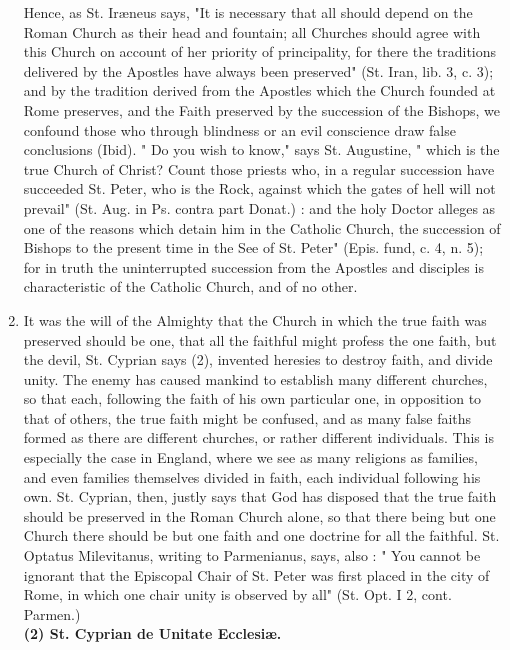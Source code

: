 \documentclass[12pt]{book}
\begin{document}
\begin{enumerate}
Hence, as St. Iræneus says, "It is necessary that all should depend on the Roman Church as their head and
fountain; all Churches should agree with this Church on account of her priority of principality, for there
the traditions delivered by the Apostles have always been preserved" (St. Iran, lib. 3, c. 3); and by the
tradition derived from the Apostles which the Church founded at Rome preserves, and the Faith
preserved by the succession of the Bishops, we confound those who through blindness or an evil
conscience draw false conclusions (Ibid). " Do you wish to know," says St. Augustine, " which is the true
Church of Christ? Count those priests who, in a regular succession have succeeded St. Peter, who is the
Rock, against which the gates of hell will not prevail" (St. Aug. in Ps. contra part Donat.) : and the holy
Doctor alleges as one of the reasons which detain him in the Catholic Church, the succession of Bishops to
the present time in the See of St. Peter" (Epis. fund, c. 4, n. 5); for in truth the uninterrupted succession
from the Apostles and disciples is characteristic of the Catholic Church, and of no other.

\item It was the will of the Almighty that the Church in which the true faith was preserved should be one,
that all the faithful might profess the one faith, but the devil, St. Cyprian says (2), invented heresies to
destroy faith, and divide unity. The enemy has caused mankind to establish many different churches, so
that each, following the faith of his own particular one, in opposition to that of others, the true faith might
be confused, and as many false faiths formed as there are different churches, or rather different
individuals. This is especially the case in England, where we see as many religions as families, and even
families themselves divided in faith, each individual following his own. St. Cyprian, then, justly says that
God has disposed that the true faith should be preserved in the Roman Church alone, so that there being
but one Church there should be but one faith and one doctrine for all the faithful. St. Optatus
Milevitanus, writing to Parmenianus, says, also : " You cannot be ignorant that the Episcopal Chair of St.
Peter was first placed in the city of Rome, in which one chair unity is observed by all" (St. Opt. I 2, cont.
Parmen.)\\
\textbf{(2) St. Cyprian de Unitate Ecclesiæ.}


\end{enumerate}
\end{document}
